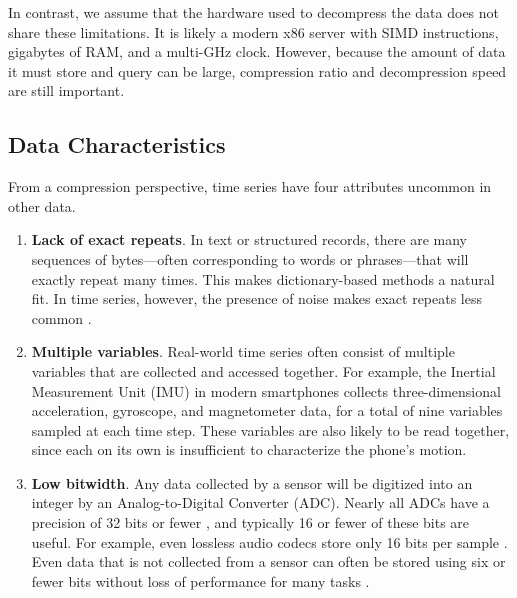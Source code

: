 In contrast, we assume that the hardware used to decompress the data does not share these limitations. It is likely a modern x86 server with SIMD instructions, gigabytes of RAM, and a multi-GHz clock. However, because the amount of data it must store and query can be large, compression ratio and decompression speed are still important.

\subsection{Data Characteristics}

From a compression perspective, time series have four attributes uncommon in other data.

\begin{enumerate}
    \item \textbf{Lack of exact repeats}. In text or structured records, there are many sequences of bytes---often corresponding to words or phrases---that will exactly repeat many times. This makes dictionary-based methods a natural fit. In time series, however, the presence of noise makes exact repeats less common \cite{extract, epenthesis}.
    \item \textbf{Multiple variables}. Real-world time series often consist of multiple variables that are collected and accessed together. For example, the Inertial Measurement Unit (IMU) in modern smartphones collects three-dimensional acceleration, gyroscope, and magnetometer data, for a total of nine variables sampled at each time step. These variables are also likely to be read together, since each on its own is insufficient to characterize the phone's motion. %
    \item \textbf{Low bitwidth}. Any data collected by a sensor will be digitized into an integer by an Analog-to-Digital Converter (ADC). Nearly all ADCs have a precision of 32 bits or fewer \cite{digikeyADCs}, and typically 16 or fewer of these bits are useful. For example, even lossless audio codecs store only 16 bits per sample \cite{flac, shorten}. Even data that is not collected from a sensor can often be stored using six or fewer bits without loss of performance for many tasks \cite{epenthesis, mdlIntrinsic, sax}.

\end{enumerate}
